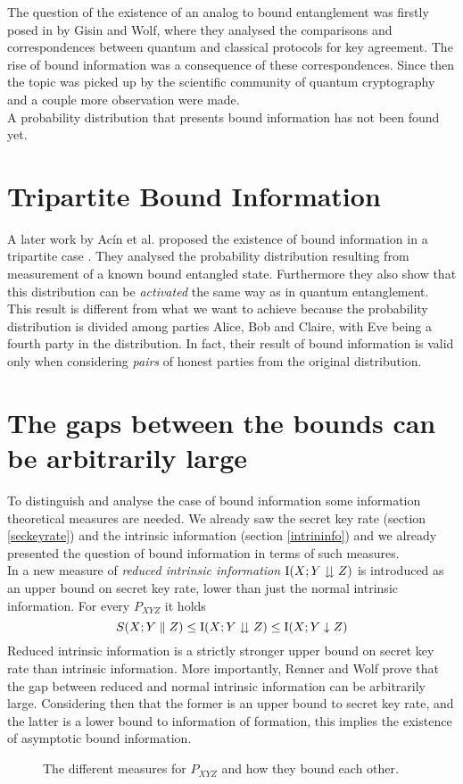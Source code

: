 The question of the existence of an analog to bound entanglement was firstly posed in \cite{GisWolf00} by Gisin and Wolf, where they analysed the comparisons and correspondences between quantum and classical protocols for key agreement. 
The rise of bound information was a consequence of these correspondences.
Since then the topic was picked up by the scientific community of quantum cryptography and a couple more observation were made.\\
A probability distribution that presents bound information has not been found yet.

\section{Tripartite Bound Information}
    A later work by Ac\'in et al. proposed the existence of bound information in a tripartite case \cite{ACM04}. 
    They analysed the probability distribution resulting from measurement of a known bound entangled state. 
    Furthermore they also show that this distribution can be \textit{activated} the same way as in quantum entanglement.\\
    This result is different from what we want to achieve because the probability distribution is divided among parties Alice, Bob and Claire, with Eve being a fourth party in the distribution. 
    In fact, their result of bound information is valid only when considering \emph{pairs} of honest parties from the original distribution.
\section{The gaps between the bounds can be arbitrarily large}
    To distinguish and analyse the case of bound information some information theoretical measures are needed. 
    We already saw the secret key rate (section \ref{seckeyrate}) and the intrinsic information (section \ref{intrininfo}) and we already presented the question of bound information in terms of such measures. \\
    In \cite{RW03} a new measure of \emph{reduced intrinsic information} $\operatorname{I}(X;Y\downdownarrows Z)$ is introduced as an upper bound on secret key rate, lower than just the normal intrinsic information.
    For every $P_{XYZ}$ it holds
    \begin{equation} \label{eq:bounds}
    	S(X;Y\parallel Z) \leq \operatorname{I}(X;Y\downdownarrows Z) \leq \operatorname{I}(X;Y\downarrow Z)
    \end{equation}
    	Reduced intrinsic information is a strictly stronger upper bound on secret key rate than intrinsic information.
    	More importantly, Renner and Wolf prove that the gap between reduced and normal intrinsic information can be arbitrarily large. 
    	Considering then that the former is an upper bound to secret key rate, and the latter is a lower bound to information of formation, this implies the existence of asymptotic bound information.
    	\begin{figure}
    		
    		\caption{The different measures for $P_{XYZ}$ and how they bound each other.}
    	\end{figure}
    	
